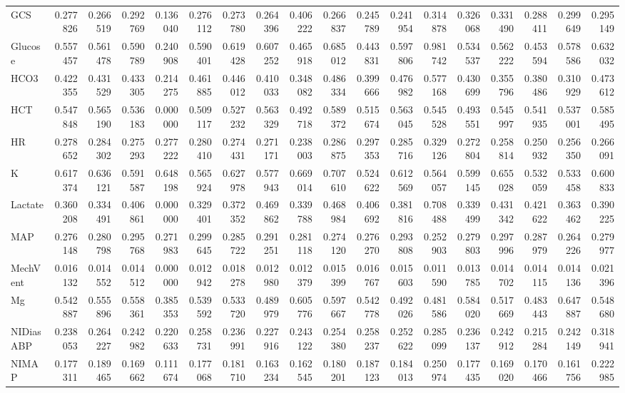 \begin{tabular}{lrrrrrrrrrrrrrrrrr}
GCS & 0.277826 & 0.266519 & 0.292769 & 0.136040 & 0.276112 & 0.273780 & 0.264396 & 0.406222 & 0.266837 & 0.245789 & 0.241954 & 0.314878 & 0.326068 & 0.331490 & 0.288411 & 0.299649 & 0.295149 \\
Glucose & 0.557457 & 0.561478 & 0.590789 & 0.240908 & 0.590401 & 0.619428 & 0.607252 & 0.465918 & 0.685012 & 0.443831 & 0.597806 & 0.981742 & 0.534537 & 0.562222 & 0.453594 & 0.578586 & 0.632032 \\
HCO3 & 0.422355 & 0.431529 & 0.433305 & 0.214275 & 0.461885 & 0.446012 & 0.410033 & 0.348082 & 0.486334 & 0.399666 & 0.476982 & 0.577168 & 0.430699 & 0.355796 & 0.380486 & 0.310929 & 0.473612 \\
HCT & 0.547848 & 0.565190 & 0.536183 & 0.000000 & 0.509117 & 0.527232 & 0.563329 & 0.492718 & 0.589372 & 0.515674 & 0.563045 & 0.545528 & 0.493551 & 0.545997 & 0.541935 & 0.537001 & 0.585495 \\
HR & 0.278652 & 0.284302 & 0.275293 & 0.277222 & 0.280410 & 0.274431 & 0.271171 & 0.238003 & 0.286875 & 0.297353 & 0.285716 & 0.329126 & 0.272804 & 0.258814 & 0.250932 & 0.256350 & 0.266091 \\
K & 0.617374 & 0.636121 & 0.591587 & 0.648198 & 0.565924 & 0.627978 & 0.577943 & 0.669014 & 0.707610 & 0.524622 & 0.612569 & 0.564057 & 0.599145 & 0.655028 & 0.532059 & 0.533458 & 0.600833 \\
Lactate & 0.360208 & 0.334491 & 0.406861 & 0.000000 & 0.329401 & 0.372352 & 0.469862 & 0.339788 & 0.468984 & 0.406692 & 0.381816 & 0.708488 & 0.339499 & 0.431342 & 0.421622 & 0.363462 & 0.390225 \\
MAP & 0.276148 & 0.280798 & 0.295768 & 0.271983 & 0.299645 & 0.285722 & 0.291251 & 0.281118 & 0.274120 & 0.276270 & 0.293808 & 0.252903 & 0.279803 & 0.297996 & 0.287979 & 0.264226 & 0.279977 \\
MechVent & 0.016132 & 0.014552 & 0.014512 & 0.000000 & 0.012942 & 0.018278 & 0.012980 & 0.012379 & 0.015399 & 0.016767 & 0.015603 & 0.011590 & 0.013785 & 0.014702 & 0.014115 & 0.014136 & 0.021396 \\
Mg & 0.542887 & 0.555896 & 0.558361 & 0.385353 & 0.539592 & 0.533720 & 0.489979 & 0.605776 & 0.597667 & 0.542778 & 0.492026 & 0.481586 & 0.584020 & 0.517669 & 0.483443 & 0.647887 & 0.548680 \\
NIDiasABP & 0.238053 & 0.264227 & 0.242982 & 0.220633 & 0.258731 & 0.236991 & 0.227916 & 0.243122 & 0.254380 & 0.258237 & 0.252622 & 0.285099 & 0.236137 & 0.242912 & 0.215284 & 0.242149 & 0.318941 \\
NIMAP & 0.177311 & 0.189465 & 0.169662 & 0.111674 & 0.177068 & 0.181710 & 0.163234 & 0.162545 & 0.180201 & 0.187123 & 0.184013 & 0.250974 & 0.177435 & 0.169020 & 0.170466 & 0.161756 & 0.222985 \\

\end{tabular}
